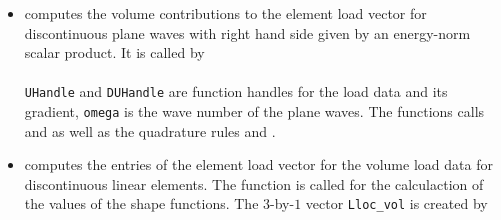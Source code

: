 \begin{itemize}
\item {} computes the volume contributions to the element load vector for discontinuous plane waves with right hand side given by an energy-norm scalar product. It is called by \\

 \\

 {\tt UHandle} and {\tt DUHandle} are function handles for the load data and its gradient, {\tt omega} is the wave number of the plane waves. The functions calls  and  as well as the quadrature rules  and . \\

\item {} computes the entries of the element load vector for the volume load data for discontinuous linear elements. The function \linebreak
{} is called for the calculaction of the values of the shape functions. The $3$-by-$1$ vector {\tt Lloc\_vol} is created by \\

\end{itemize}


